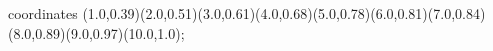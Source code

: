 					coordinates { (1.0,0.39)(2.0,0.51)(3.0,0.61)(4.0,0.68)(5.0,0.78)(6.0,0.81)(7.0,0.84)(8.0,0.89)(9.0,0.97)(10.0,1.0)};